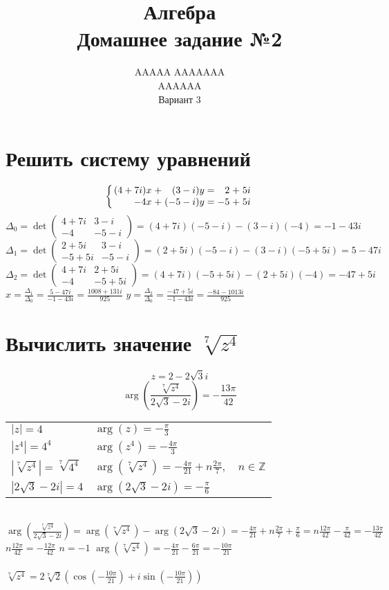 \documentclass{article}
\title{Алгебра \\ Домашнее задание №2}
\author{AAAAA AAAAAAA \\ AAAAAA \\ Вариант 3}
\newcommand{\ds}{\displaystyle}
\newcommand{\abs}[1]{\left|#1\right|}
\newcommand{\Arg}[1]{\arg\left(#1\right)}
\newcommand{\TrigFrom}[1]{
  \left(\cos\left({#1}\right)+i\sin\left({#1}\right)\right)
}
\begin{document}
  \maketitle

  \section{Решить систему уравнений}
  \[
    \left\{
      \arraycolsep=1.4pt
      \begin{array}{rrrrrrr}
        (4+7i)x &+& (3-i)y &=& 2&+&5i \\
        -4x &+& (-5-i)y &=& -5&+&5i
      \end{array}
    \right.
  \]
  $\ds \Delta_0 = \det\begin{pmatrix}
    4+7i & 3-i \\
    -4 & -5-i
  \end{pmatrix} = (4+7i)(-5-i)-(3-i)(-4) = -1-43i$
  \\
  $\ds \Delta_1 = \det\begin{pmatrix}
    2+5i & 3-i \\
    -5+5i & -5-i
  \end{pmatrix} = (2+5i)(-5-i)-(3-i)(-5+5i) = 5-47i$
  \\
  $\ds \Delta_2 = \det\begin{pmatrix}
    4+7i & 2+5i \\
    -4 & -5+5i
  \end{pmatrix} = (4+7i)(-5+5i)-(2+5i)(-4) = -47+5i$
  \\
  $\ds x = \frac{\Delta_1}{\Delta_0} = \frac{5-47i}{-1-43i} = \frac{1008 + 131i}{925}$ \quad
  $\ds y = \frac{\Delta_2}{\Delta_0} = \frac{-47+5i}{-1-43i} = \frac{-84 - 1013i}{925}$

  \section{Вычислить значение $\sqrt[7]{z^4}$}
  $$ z = 2 - 2\sqrt{3}i $$
  $$ \Arg{ \frac{\sqrt[7]{z^4}}{2\sqrt{3} - 2i} } = -\frac{13\pi}{42} $$
  \begin{tabular}{ll}
    $\ds \abs{z} = 4$ & $\ds \Arg z = -\frac{\pi}{3}$ \\
    $\ds \abs{z^4} = 4^4$ & $\ds \Arg{z^4} = -\frac{4\pi}{3}$ \\
    $\ds \abs{\sqrt[7]{z^4}} = \sqrt[7]{4^4}$ & $\ds \Arg{\sqrt[7]{z^4}} = -\frac{4\pi}{21} + n\frac{2\pi}{7},\quad n\in\mathbb{Z}$ \\
    $\ds \abs{2\sqrt{3} - 2i} = 4$ & $\ds \Arg{2\sqrt{3} - 2i} = -\frac{\pi}{6}$
  \end{tabular} \\
  $\ds \Arg{ \frac{\sqrt[7]{z^4}}{2\sqrt{3} - 2i} }
    = \Arg{\sqrt[7]{z^4}} - \Arg{2\sqrt{3} - 2i}
    = -\frac{4\pi}{21} + n\frac{2\pi}{7} + \frac{\pi}{6}
    = n\frac{12\pi}{42} - \frac{\pi}{42}
    = -\frac{13\pi}{42}
  $ \\
  $\ds n\frac{12\pi}{42} = -\frac{12\pi}{42}$ \quad $n = -1$ \quad
  $\ds \Arg{\sqrt[7]{z^4}} = -\frac{4\pi}{21} - \frac{6\pi}{21} = -\frac{10\pi}{21}$ \\ \\
  $\ds \sqrt[7]{z^4} = 2\sqrt[7]{2} \TrigFrom{-\frac{10\pi}{21}}$
\end{document}

